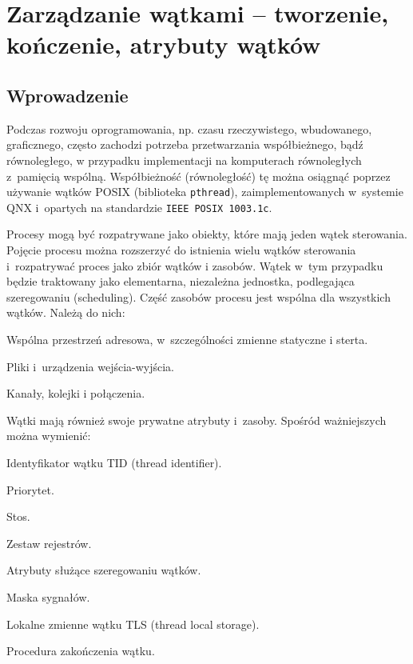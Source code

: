 \section{Zarządzanie wątkami – tworzenie, kończenie, atrybuty wątków}

\subsection{Wprowadzenie}

Podczas rozwoju oprogramowania, np. czasu rzeczywistego, wbudowanego, graficznego, często zachodzi potrzeba przetwarzania współbieżnego, bądź równoległego, w przypadku implementacji na komputerach równoległych z~pamięcią wspólną. Współbieżność (równoległość) tę można osiągnąć poprzez używanie wątków POSIX (biblioteka \lstinline[style=MyBashStyle]{pthread}), zaimplementowanych w~systemie QNX i~opartych na standardzie \lstinline[style=MyBashStyle]{IEEE POSIX 1003.1c}.

Procesy mogą być rozpatrywane jako obiekty, które mają jeden wątek sterowania. Pojęcie procesu można rozszerzyć do istnienia wielu wątków sterowania i~rozpatrywać proces jako zbiór wątków i zasobów. Wątek w~tym przypadku będzie traktowany jako elementarna, niezależna jednostka, podlegająca szeregowaniu (scheduling). Część zasobów procesu jest wspólna dla wszystkich wątków. Należą do nich:

\begin{myitemize}
\item Wspólna przestrzeń adresowa, w~szczególności zmienne statyczne i sterta.
\item Pliki i~urządzenia wejścia-wyjścia.
\item Kanały, kolejki i połączenia.
\end{myitemize}

Wątki mają również swoje prywatne atrybuty i~zasoby. Spośród ważniejszych można wymienić:

\begin{myitemize}
\item Identyfikator wątku TID (thread identifier).
\item Priorytet.
\item Stos.
\item Zestaw rejestrów.
\item Atrybuty służące szeregowaniu wątków.
\item Maska sygnałów.
\item Lokalne zmienne wątku TLS (thread local storage).
\item Procedura zakończenia wątku.
\end{myitemize}

